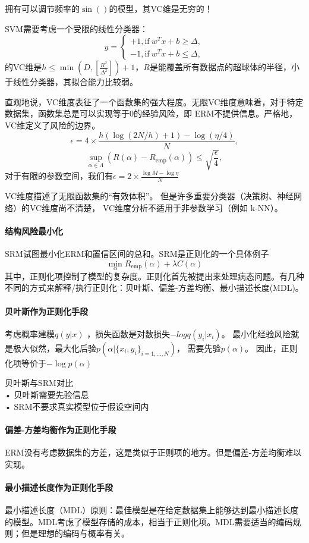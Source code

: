 拥有可以调节频率的$\sin()$的模型，其VC维是无穷的！

SVM需要考虑一个受限的线性分类器：$$y=\left\{\begin{aligned} 
+1, \text{if}\ w^Tx+b\ge \Delta, \\
-1, \text{if}\ w^Tx+b\le \Delta,
\end{aligned}\right.$$的VC维是$h \le \min(D, [\frac{R^2}{\Delta^2}]) + 1$，$R$是能覆盖所有数据点的超球体的半径，小于线性分类器，其拟合能力比较弱。

直观地说，VC维度表征了一个函数集的强大程度。无限VC维度意味着，对于特定数据集，函数集总是可以实现等于0的经验风险，即 ERM不提供信息。严格地，VC维定义了风险的边界。
$$
\epsilon = 4\times \frac{h(\log(2N/h)+1) - \log(\eta/4)}{N},
$$
$$
\sup_{\alpha \in \Lambda}(R(\alpha) - R_\text{emp}(\alpha)) \le \sqrt{\frac{\epsilon}{4}},
$$
对于有限的参数空间，我们有$\epsilon = 2 \times \frac{\log M - \log \eta}{N}$

VC维度描述了无限函数集的“有效体积”。
但是许多重要分类器（决策树、神经网络）的VC维度尚不清楚，
VC维度分析不适用于非参数学习（例如 k-NN）。

\paragraph{结构风险最小化}
SRM试图最小化ERM和置信区间的总和。SRM是正则化的一个具体例子
$$\min_\alpha R_\text{emp}(\alpha) + \lambda C(\alpha)$$
其中，正则化项控制了模型的复杂度。正则化首先被提出来处理病态问题。有几种不同的方式来解释/执行正则化：贝叶斯、偏差-方差均衡、最小描述长度(MDL)。

\paragraph{贝叶斯作为正则化手段}
考虑概率建模$q(y|x)$
，损失函数是对数损失$-log q(y_i|x_i)$。
最小化经验风险就是极大似然，最大化后验$p(\alpha | \{x_i, y_i\}_{i = 1,\ldots, N})$，
需要先验$p(\alpha)$。
因此，正则化项等价于$-\log p(\alpha)$

贝叶斯与SRM对比\\
• 贝叶斯需要先验信息\\
• SRM不要求真实模型位于假设空间内 

\paragraph{偏差-方差均衡作为正则化手段} ERM没有考虑数据集的方差，这是类似于正则项的地方。但是偏差-方差均衡难以实现。

\paragraph{最小描述长度作为正则化手段} 最小描述长度（MDL）原则：最佳模型是在给定数据集上能够达到最小描述长度的模型。MDL考虑了模型存储的成本，相当于正则化项。MDL需要适当的编码规则；但是理想的编码与概率有关。

